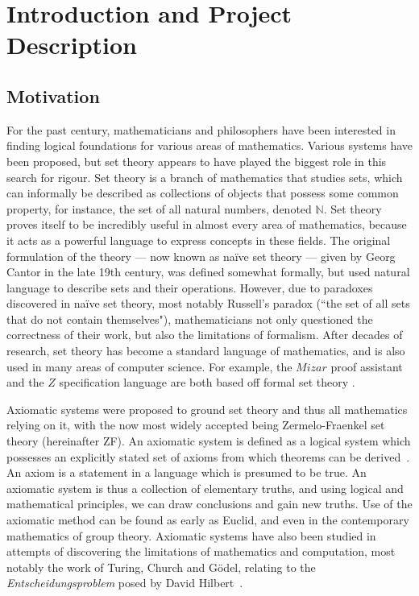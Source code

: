 \documentclass[11pt]{report}
\theoremstyle{definition}
\theoremstyle{theorem}
\theoremstyle{lemma}
\begin{document}
\tableofcontents

\chapter{Introduction and Project Description}
\section{Motivation}
For the past century, mathematicians and philosophers have been interested in finding logical foundations for various areas of mathematics. Various systems have been proposed, but set theory appears to have played the biggest role in this search for rigour.
Set theory is a branch of mathematics that studies sets, which can informally be described as collections of objects that possess some common property, for instance, the set of all natural numbers, denoted $\mathbb{N}$.
Set theory proves itself to be incredibly useful in almost every area of mathematics, because it acts as a powerful language to express concepts in these fields.
The original formulation of the theory --- now known as na\"ive set theory --- given by Georg Cantor in the late 19th century, was defined somewhat formally, but used natural language to describe sets and their operations.
However, due to paradoxes discovered in na\"ive set theory, most notably Russell's paradox (``the set of all sets that do not contain themselves"), mathematicians not only questioned the correctness of their work, but also the limitations of formalism.
After decades of research, set theory has become a standard language of mathematics, and is also used in many areas of computer science.
For example, the $\mathit{Mizar}$ proof assistant and the $\mathit{Z}$ specification language are both based off formal set theory \cite{mizar} \cite{zspec}.

Axiomatic systems were proposed to ground set theory and thus all mathematics relying on it, with the now most widely accepted being Zermelo-Fraenkel set theory (hereinafter ZF).
An axiomatic system is defined as a logical system which possesses an explicitly stated set of axioms from which theorems can be derived~\cite{wolfaxiom}.
An axiom is a statement in a language which is presumed to be true.
An axiomatic system is thus a collection of elementary truths, and using logical and mathematical principles, we can draw conclusions and gain new truths.
Use of the axiomatic method can be found as early as Euclid, and even in the contemporary mathematics of group theory.
Axiomatic systems have also been studied in attempts of discovering the limitations of mathematics and computation, most notably the work of Turing, Church and G\"odel, relating to the \emph{Entscheidungsproblem} posed by David Hilbert~\cite{stancomput}.\\
\end{document}
